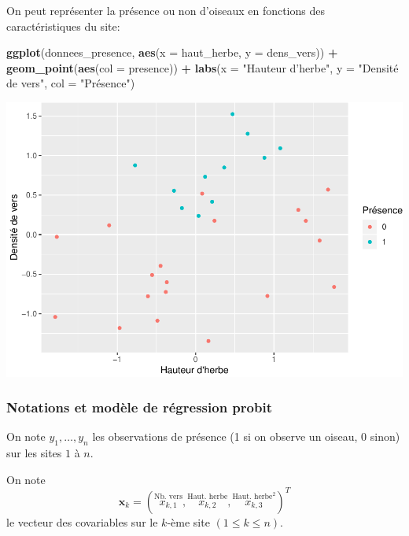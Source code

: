 \documentclass[]{article}
\newenvironment{Shaded}{\begin{snugshade}}{\end{snugshade}}
\newcommand{\DataTypeTok}[1]{\textcolor[rgb]{0.13,0.29,0.53}{#1}}
\newcommand{\KeywordTok}[1]{\textcolor[rgb]{0.13,0.29,0.53}{\textbf{#1}}}
\newcommand{\NormalTok}[1]{#1}
\newcommand{\OperatorTok}[1]{\textcolor[rgb]{0.81,0.36,0.00}{\textbf{#1}}}
\newcommand{\StringTok}[1]{\textcolor[rgb]{0.31,0.60,0.02}{#1}}
\begin{document}
On peut représenter la présence ou non d'oiseaux en fonctions des
caractéristiques du site:

\begin{Shaded}
\begin{Highlighting}[]
\KeywordTok{ggplot}\NormalTok{(donnees_presence, }\KeywordTok{aes}\NormalTok{(}\DataTypeTok{x =}\NormalTok{ haut_herbe, }\DataTypeTok{y =}\NormalTok{ dens_vers)) }\OperatorTok{+}
\StringTok{  }\KeywordTok{geom_point}\NormalTok{(}\KeywordTok{aes}\NormalTok{(}\DataTypeTok{col =}\NormalTok{ presence)) }\OperatorTok{+}\StringTok{ }
\StringTok{  }\KeywordTok{labs}\NormalTok{(}\DataTypeTok{x =} \StringTok{"Hauteur d'herbe"}\NormalTok{, }
       \DataTypeTok{y =} \StringTok{"Densité de vers"}\NormalTok{, }
       \DataTypeTok{col =} \StringTok{"Présence"}\NormalTok{)}
\end{Highlighting}
\end{Shaded}

\includegraphics{chapitre_inference_bayesienne_files/figure-latex/plot_donnees_presence-1.pdf}

\hypertarget{notations-et-moduxe8le-de-ruxe9gression-probit}{%
\subsubsection{Notations et modèle de régression
probit}\label{notations-et-moduxe8le-de-ruxe9gression-probit}}

On note \(y_1, \dots, y_n\) les observations de présence (1 si on
observe un oiseau, 0 sinon) sur les sites \(1\) à \(n\).

On note
\[\mathbf{x}_k = (\overset{\text{Nb. vers}}{x_{k,1}}, \overset{\text{Haut. herbe}}{x_{k,2}}, \overset{\text{Haut. herbe}^2}{x_{k,3}})^T\]
le vecteur des covariables sur le \(k\)-ème site \((1\leq k \leq n)\).
\end{document}
